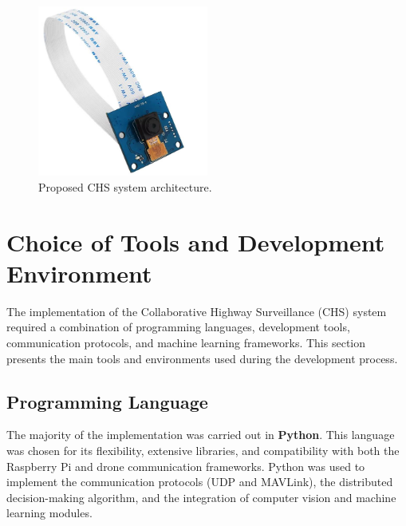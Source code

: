 \begin{figure}[H]  
    \centering
    \includegraphics[width=0.5\textwidth]{Figures/Chapter5/Section2/camera.png} %
    \caption{Proposed CHS system architecture.}
    \label{fig:proposed_architecture} %
\end{figure}



\section{Choice of Tools and Development Environment}

The implementation of the Collaborative Highway Surveillance (CHS) system required a 
combination of programming languages, development tools, communication protocols, 
and machine learning frameworks. This section presents the main tools and environments 
used during the development process.

\subsection*{Programming Language}
The majority of the implementation was carried out in \textbf{Python}. This language was chosen 
for its flexibility, extensive libraries, and compatibility with both the Raspberry Pi and 
drone communication frameworks. Python was used to implement the communication 
protocols (UDP and MAVLink), the distributed decision-making algorithm, and 
the integration of computer vision and machine learning modules. 


